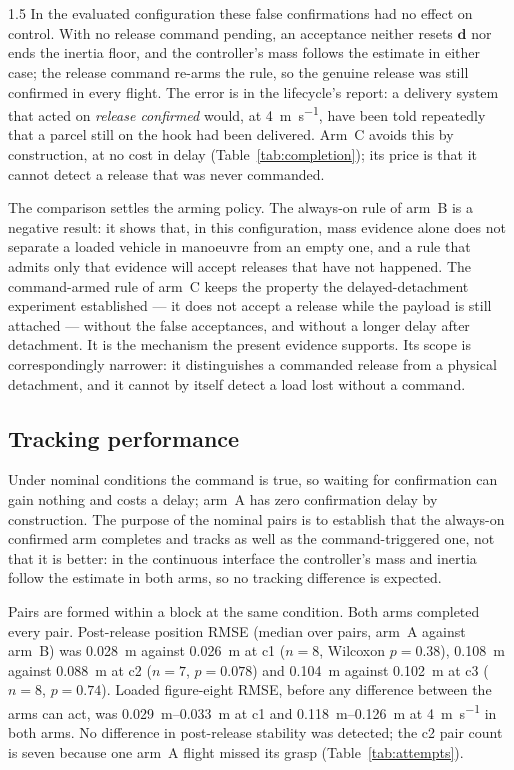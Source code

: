 \begin{spacing}{1.5}
In the evaluated configuration these false confirmations had no effect on
control. With no release command pending, an acceptance neither resets
$\hat{\bm d}$ nor ends the inertia floor, and the controller's mass follows the
estimate in either case; the release command re-arms the rule, so the genuine
release was still confirmed in every flight. The error is in the lifecycle's
report: a delivery system that acted on \emph{release confirmed} would, at
\SI{4}{\meter\per\second}, have been told repeatedly that a parcel still on the
hook had been delivered. Arm~C avoids this by construction, at no cost in delay
(Table~\ref{tab:completion}); its price is that it cannot detect a release that
was never commanded.

The comparison settles the arming policy. The always-on rule of arm~B is a
negative result: it shows that, in this configuration, mass evidence alone does
not separate a loaded vehicle in manoeuvre from an empty one, and a rule that
admits only that evidence will accept releases that have not happened. The
command-armed rule of arm~C keeps the property the delayed-detachment experiment
established --- it does not accept a release while the payload is still
attached --- without the false acceptances, and without a longer delay after
detachment. It is the mechanism the present evidence supports. Its scope is
correspondingly narrower: it distinguishes a commanded release from a physical
detachment, and it cannot by itself detect a load lost without a command.

\subsection{Tracking performance}\label{sec:eval:nominal}

Under nominal conditions the command is true, so waiting for confirmation can
gain nothing and costs a delay; arm~A has zero confirmation delay by
construction. The purpose of the nominal pairs is to establish that the
always-on confirmed arm completes and tracks as well as the command-triggered
one, not that it is better: in the continuous interface the controller's mass
and inertia follow the estimate in both arms, so no tracking difference is
expected.

Pairs are formed within a block at the same condition. Both arms completed
every pair. Post-release position RMSE (median over pairs, arm~A against
arm~B) was \SI{0.028}{\meter} against \SI{0.026}{\meter} at c1 ($n=8$,
Wilcoxon $p=0.38$), \SI{0.108}{\meter} against \SI{0.088}{\meter} at c2
($n=7$, $p=0.078$) and \SI{0.104}{\meter} against \SI{0.102}{\meter} at c3
($n=8$, $p=0.74$). Loaded figure-eight RMSE, before any difference between the
arms can act, was \SIrange{0.029}{0.033}{\meter} at c1 and
\SIrange{0.118}{0.126}{\meter} at \SI{4}{\meter\per\second} in both arms. No
difference in post-release stability was detected; the c2 pair count is seven
because one arm~A flight missed its grasp (Table~\ref{tab:attempts}).


\end{spacing}
